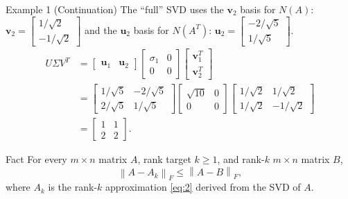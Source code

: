 \documentclass[aspectratio=169,xcolor=dvipsnames]{beamer}
\begin{document}
\begin{frame}{Example 1 (Continuation)}
    The \enquote{full} SVD uses the $\textbf{v}_2$ basis for $N (A)$: $\textbf{v}_2 = \begin{bmatrix}
        1 / \sqrt{2} \\ -1 / \sqrt{2}
    \end{bmatrix}$ and the $\textbf{u}_2$ basis for $N(A^{T})$: $\textbf{u}_2 = \begin{bmatrix}
        -2 / \sqrt{5}\\ 1/ \sqrt{5} 
    \end{bmatrix}$.\\
    \begin{align*}
        U \Sigma V^{T} &= \begin{bmatrix}
            \textbf{u}_1 & \textbf{u}_2
        \end{bmatrix} \begin{bmatrix}
            \sigma_1 & 0\\
            0 & 0
        \end{bmatrix} \begin{bmatrix}
            \textbf{v}^{T}_1 \\ \textbf{v}^T_2
        \end{bmatrix} \\
        &= \begin{bmatrix}
            1/\sqrt{5} & -2/\sqrt{5} \\
            2/ \sqrt{5} & 1/\sqrt{5}
        \end{bmatrix} \begin{bmatrix}
            \sqrt{10} & 0\\
            0 & 0
        \end{bmatrix} \begin{bmatrix}
            1/ \sqrt{2} & 1/ \sqrt{2}\\
            1/ \sqrt{2} & -1/\sqrt{2}
        \end{bmatrix}\\
        &= \begin{bmatrix}
            1 & 1\\ 2 & 2
        \end{bmatrix}.
    \end{align*}
\end{frame}

\begin{frame}{Fact}
    For every $m\times n$ matrix $A$, rank target $k\geq 1$, and rank-$k$ $m\times n$ matrix $B$,
    \begin{equation}
        \label{eq:3}
        \left\| A - A_k\right\|_F \leq \left\| A- B\right\|_F ,
    \end{equation}
    where $A_k$ is the rank-$k$ approximation \eqref{eq:2} derived from the SVD of $A$.
\end{frame}
\end{document}

